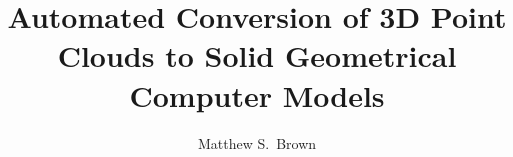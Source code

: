 \documentclass[12pt]{drexelthesis}
\title{Automated Conversion of 3D Point Clouds to Solid Geometrical Computer Models}
\author{Matthew S.~Brown}
\begin{document}







\cite{RN29}
\cite{RN40}
\cite{RN30}
\cite{RN31}

\cite{RN20}
\cite{sift}
\cite{surf}

\cite{basic-measurement-principles}

\cite{Stroud2006}

\cite{RN60}
\cite{ransac1}

\cite{RN33}

\cite{RN66}

\cite{ballpivot}
\cite{RN67}

\cite{meshrefinement}
\cite{meshfairing}
\cite{laplacianimage}

\cite{RN61}


\cite{ODT}

\cite{RN63}

\cite{RN64}

\cite{RN8}
\cite{RN72}


\cite{RN44}

\pagebreak
{}
\begin{spacing}{1.0}


\end{spacing}

\newpage
\thispagestyle{empty}

                                                                                                
\end{document}
